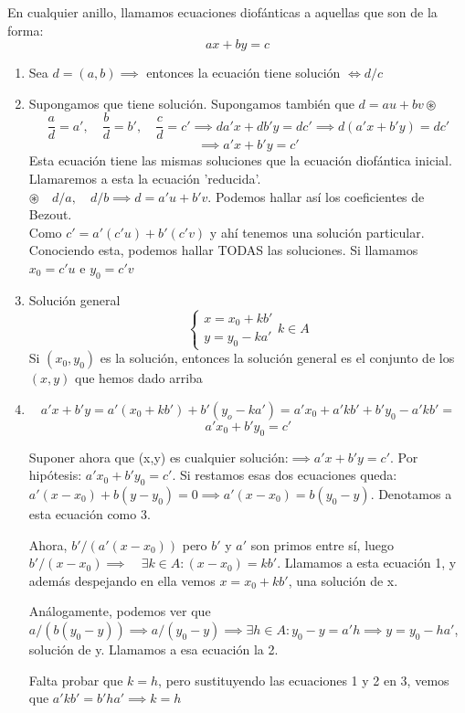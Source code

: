 \documentclass[11pt, a4paper, titlepage]{article}
\makeatletter
\renewenvironment{proof}[1][\proofname] {\vspace{-15pt}\par\pushQED{\qed}\normalfont\topsep6\p@\@plus6\p@\relax\trivlist\item[\hskip\labelsep\it#1\@addpunct{.}]\ignorespaces}{\popQED\endtrivlist\@endpefalse}
\theoremstyle{theorem-style}
\theoremstyle{definition-style}
\theoremstyle{remark-style}
\theoremstyle{example-style}
\newenvironment{nlist}
{\begin{enumerate}
\renewcommand\labelenumi{(\emph{\roman{enumi})}}}
{\end{enumerate}}
\makeatother
\begin{document}
En cualquier anillo, llamamos ecuaciones diofánticas a aquellas que son de la forma:
\[
ax +by  = c
\]
\begin{nlist}
	\item Sea $d=(a,b)\implies$ entonces la ecuación tiene solución $\iff d/c$
	\item Supongamos que tiene solución. Supongamos también que $d= au+bv \circledast$
\[
\frac{a}{d}= a',\quad \frac{b}{d}=b',\quad \frac{c}{d}=c'\implies da'x + db'y = dc' \implies d(a'x+b'y)=dc'\]
\[ \implies a'x+b'y = c'
\]
Esta ecuación tiene las mismas soluciones que la ecuación diofántica inicial. Llamaremos a esta la ecuación 'reducida'.\\
$\circledast\quad d/a ,\quad d/b \implies d=a'u +b 'v $. Podemos hallar así los coeficientes de Bezout.\\

Como $c'= a'(c'u)+b'(c'v)$ y ahí tenemos una solución particular. Conociendo esta, podemos hallar TODAS las soluciones. Si llamamos $x_0 =c'u$ e $y_0 = c'v$

\item Solución general \[\begin{cases}
	x = x_0 +kb'\\
	y= y_0 -ka'
\end{cases} k\in A\]
Si $(x_0,y_0)$ es la solución, entonces la solución general es el conjunto de los $(x,y)$ que hemos dado arriba
\\
\begin{proof}[Demostración de iii)]

\[
a'x + b'y = a'(x_0 +kb') + b'(y_o - ka') = a'x_0 + a'kb' + b'y_0 - a'kb' = 
\]
\[
a'x_0 +b'y_0 = c'
\]

Suponer ahora que (x,y) es cualquier solución:$\implies a'x +b'y = c'$. Por hipótesis: $a'x_0 +b'y_0 = c'$. Si restamos esas dos ecuaciones queda: $a'(x-x_0) +b(y-y_0) = 0 \implies a'(x-x_0) = b(y_0-y)$. Denotamos a esta ecuación como 3.

Ahora, $b'/(a'(x-x_0))$ pero $b'$ y $a'$ son primos entre sí, luego $b'/(x-x_0)\implies \quad \exists k \in A : (x-x_0) = kb'$. Llamamos a esta ecuación 1, y además despejando en ella vemos $x = x_0 + kb'$, una solución de x.

Análogamente, podemos ver que $a/(b(y_0-y)) \implies a/(y_0-y) \implies \exists h \in A: y_0 -y = a'h \implies y = y_0 - ha'$, solución de y. Llamamos a esa ecuación la 2.

Falta probar que $k = h$, pero sustituyendo las ecuaciones 1 y 2 en 3, vemos que $a'kb'  = b'ha' \implies k = h$
	
\end{proof}

\end{nlist}
\end{document}
